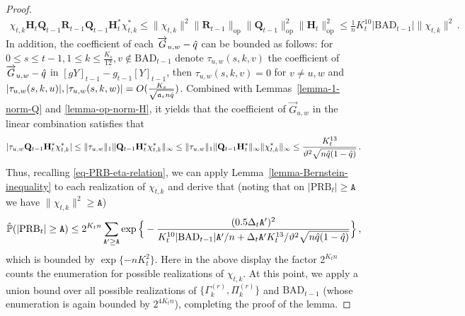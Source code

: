 \documentclass[11pt]{article}
\numberwithin{equation}{section}
\begin{document}
\begin{proof}
\begin{align*}
    \chi_{t,k} \mathbf{H}_{t} \mathbf{Q}_{t-1} \mathbf{R}_{t-1} \mathbf{Q}_{t-1} \mathbf{H}_{t}^{*} \chi_{t,k}^{*} \leq \| \chi_{t,k} \|^2 \| \mathbf{R}_{t-1} \|_{\mathrm{op}} \| \mathbf{Q}_{t-1} \|^2_{\mathrm{op}} \| \mathbf{H}_{t} \|^2_{\mathrm{op}} \leq \frac{1}{n} K_t^{10} |\mathrm{BAD}_{t-1}| \| \chi_{t,k} \|^2 \,.
\end{align*}
In addition, the coefficient of each $\overrightarrow{G}_{u,w}- \Hat{q}$ can be bounded as follows: for  $0 \leq s \leq t-1, 1 \leq k \leq \frac{K_s}{12}, v \not \in \mathrm{BAD}_{t-1}$ denote $\tau_{u,w}(s,k,v)$ the coefficient of $\overrightarrow{G}_{u,w}-\Hat{q}$ in $[gY]_{t-1} - g_{t-1}[Y]_{t-1}$, then $\tau_{u,w}(s,k,v) = 0$ for $v \neq u,w$ and $|\tau_{u,w}(s,k,u)|, |\tau_{u,w}(s,k,w)| = O( \frac{K_s}{\sqrt{ \mathfrak{a}_s n \Hat{q} }} )$. Combined with Lemmas~\ref{lemma-1-norm-Q} and \ref{lemma-op-norm-H}, it yields that  the coefficient of $\overrightarrow{G}_{u,w}$ in the linear combination satisfies that
\begin{align*}
    | \tau_{u,w} \mathbf{Q}_{t-1} \mathbf{H}_{t}^{*} \chi_{t,k}^{*} | \leq \| \tau_{u,w} \|_{1} \| \mathbf{Q}_{t-1} \mathbf{H}_{t}^{*} \chi_{t,k}^{*} \|_{\infty} \leq \| \tau_{u,w} \|_{1} \| \mathbf{Q}_{t-1} \mathbf{H}_{t}^{*} \|_{\infty}  \| \chi_{t,k}^{*} \|_{\infty} \leq \frac{ K_t^{13} }{ \vartheta^{2} \sqrt{ n \Hat{q}(1-\Hat{q}) } }\,.
\end{align*}
Thus, recalling \eqref{eq-PRB-eta-relation}, we can apply Lemma~\ref{lemma-Bernstein-inequality} to each realization of $\chi_{t, k}$ and derive that (noting that on $|\mathrm{PRB}_t| \geq \mathtt A $ we have $\|\chi_{t, k}\|^2 \geq \mathtt A$)
\begin{align*}
    \Hat{\mathbb P}(|\mathrm{PRB}_t| \geq \mathtt A ) 
    \leq 2^{K_t n}\sum_{\mathtt A' \geq \mathtt A} \exp \Big\{ - \frac{ ( 0.5 \Delta_t \mathtt A')^2 }{  K_t^{10} |\mathrm{BAD}_{t-1}| \mathtt A'/n + \Delta_t \mathtt A' K_t^{13} / \vartheta^{2} \sqrt{n\Hat{q}(1-\Hat{q})}  } \Big\} \,,
\end{align*}
which is bounded by $\exp \{ - n K_t^2 \}$.
Here in the above display the factor $2^{K_t n}$ counts the enumeration for possible realizations of $\chi_{t, k}$.
At this point, we apply a union bound over all possible realizations of $\{ \Gamma^{(r)}_k,\Pi^{(r)}_k \}$ and  $\mathrm{BAD}_{t-1}$ (whose enumeration is again bounded by $2^{4 K_t n}$), completing the proof of the lemma. 
\end{proof}
\end{document}
